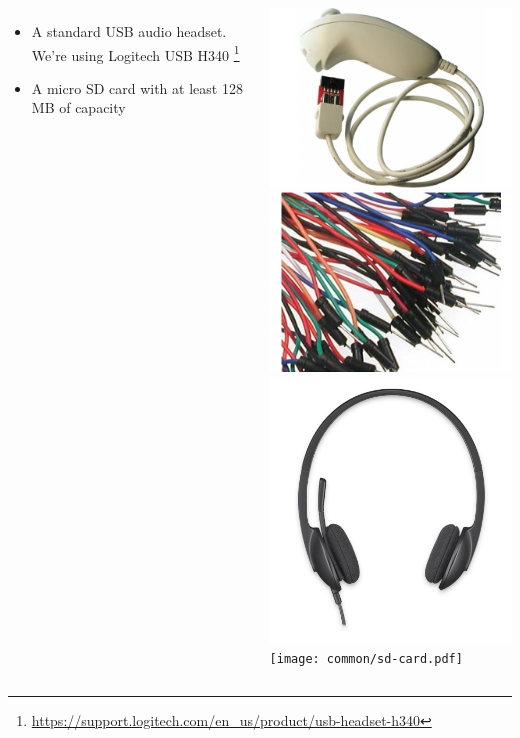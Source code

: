 \begin{frame}
\begin{columns}
\begin{itemize}
      \item A standard USB audio headset. We're using Logitech USB H340
	    \footnote{\tiny \url{https://support.logitech.com/en_us/product/usb-headset-h340}}
      \item A micro SD card with at least 128 MB of capacity
    \end{itemize}
    \includegraphics[height=0.25\textheight]{common/nunchuk.jpg} \\
    \includegraphics[height=0.15\textheight]{common/jumper-wires.jpg} \\
    \includegraphics[height=0.15\textheight]{common/logitech-h340.png} \\
    \texttt{[image: common/sd-card.pdf]}
  \end{columns}
\end{frame}
